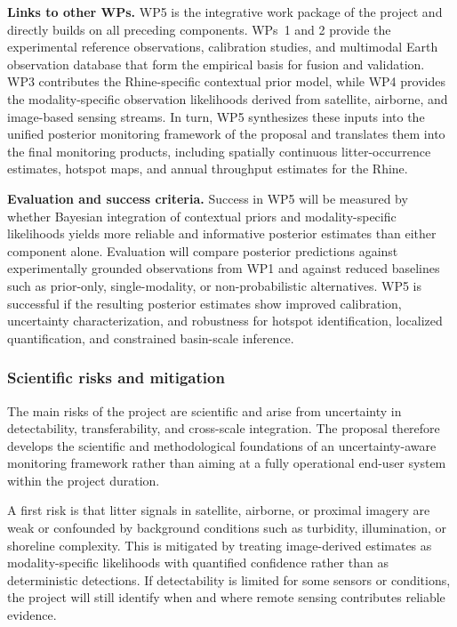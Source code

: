 \documentclass{scrartcl}
\begin{document}
\textbf{Links to other WPs.} WP5 is the integrative work package of the project and directly builds on all preceding components. WPs~1 and 2 provide the experimental reference observations, calibration studies, and multimodal Earth observation database that form the empirical basis for fusion and validation. WP3 contributes the Rhine-specific contextual prior model, while WP4 provides the modality-specific observation likelihoods derived from satellite, airborne, and image-based sensing streams. In turn, WP5 synthesizes these inputs into the unified posterior monitoring framework of the proposal and translates them into the final monitoring products, including spatially continuous litter-occurrence estimates, hotspot maps, and annual throughput estimates for the Rhine.

\textbf{Evaluation and success criteria.} Success in WP5 will be measured by whether Bayesian integration of contextual priors and modality-specific likelihoods yields more reliable and informative posterior estimates than either component alone. Evaluation will compare posterior predictions against experimentally grounded observations from WP1 and against reduced baselines such as prior-only, single-modality, or non-probabilistic alternatives. WP5 is successful if the resulting posterior estimates show improved calibration, uncertainty characterization, and robustness for hotspot identification, localized quantification, and constrained basin-scale inference.

\subsubsection{Scientific risks and mitigation}

The main risks of the project are scientific and arise from uncertainty in detectability, transferability, and cross-scale integration. The proposal therefore develops the scientific and methodological foundations of an uncertainty-aware monitoring framework rather than aiming at a fully operational end-user system within the project duration.

A first risk is that litter signals in satellite, airborne, or proximal imagery are weak or confounded by background conditions such as turbidity, illumination, or shoreline complexity. This is mitigated by treating image-derived estimates as modality-specific likelihoods with quantified confidence rather than as deterministic detections. If detectability is limited for some sensors or conditions, the project will still identify when and where remote sensing contributes reliable evidence.
\end{document}
